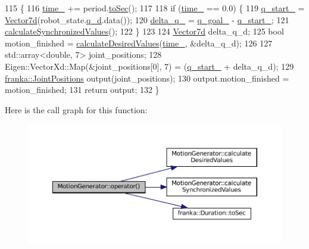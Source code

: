 \begin{DoxyCode}
115                                                                           \{
116   \hyperlink{classMotionGenerator_a42b90532e4f257bb592b3c2a8e8e370f}{time\_} += period.\hyperlink{classfranka_1_1Duration_a497af77a3280159547f231f0374e9ac1}{toSec}();
117 
118   \textcolor{keywordflow}{if} (\hyperlink{classMotionGenerator_a42b90532e4f257bb592b3c2a8e8e370f}{time\_} == 0.0) \{
119     \hyperlink{classMotionGenerator_a11a7cfc3fa6c19202c7dcc2f5282046e}{q\_start\_} = \hyperlink{classMotionGenerator_a499bd17d3a5c7583b4c06923f532185d}{Vector7d}(robot\_state.\hyperlink{structfranka_1_1RobotState_a706045af1b176049e9e56df755325bd2}{q\_d}.data());
120     \hyperlink{classMotionGenerator_a943798bdc9c985f66548c59d562fd8b7}{delta\_q\_} = \hyperlink{classMotionGenerator_a181e3ac9ca9d23a813e06a69e4583ec7}{q\_goal\_} - \hyperlink{classMotionGenerator_a11a7cfc3fa6c19202c7dcc2f5282046e}{q\_start\_};
121     \hyperlink{classMotionGenerator_aa366f6b1183f1c0f8c4fb745d7a927d2}{calculateSynchronizedValues}();
122   \}
123 
124   \hyperlink{classMotionGenerator_a499bd17d3a5c7583b4c06923f532185d}{Vector7d} delta\_q\_d;
125   \textcolor{keywordtype}{bool} motion\_finished = \hyperlink{classMotionGenerator_a7d436455ec33c3cbe8427b6d8611c83f}{calculateDesiredValues}(\hyperlink{classMotionGenerator_a42b90532e4f257bb592b3c2a8e8e370f}{time\_}, &delta\_q\_d);
126 
127   std::array<double, 7> joint\_positions;
128   Eigen::VectorXd::Map(&joint\_positions[0], 7) = (\hyperlink{classMotionGenerator_a11a7cfc3fa6c19202c7dcc2f5282046e}{q\_start\_} + delta\_q\_d);
129   \hyperlink{classfranka_1_1JointPositions}{franka::JointPositions} output(joint\_positions);
130   output.motion\_finished = motion\_finished;
131   \textcolor{keywordflow}{return} output;
132 \}
\end{DoxyCode}
Here is the call graph for this function\+:
\nopagebreak
\begin{figure}[H]
\begin{center}
\leavevmode
\includegraphics[width=350pt]{classMotionGenerator_aefd763e7c31c54b56404f33d2295fda9_cgraph}
\end{center}
\end{figure}


